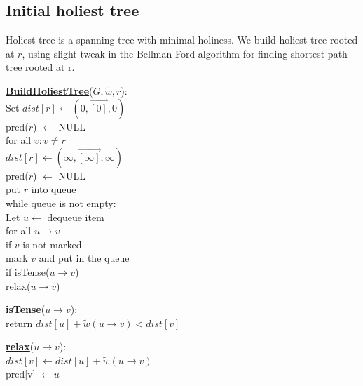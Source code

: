 \documentclass{article}
\begin{document}
\subsection{Initial holiest tree}
Holiest tree is a spanning tree with minimal holiness. We build holiest tree 
rooted at $r$, using slight tweak in the Bellman-Ford algorithm for finding 
shortest path tree rooted at r. \\

\begin{minipage}[t]{0.58\linewidth}
\begin{algorithm}
\textbf{\underline{BuildHoliestTree}}($G, \tilde w , r$): \\ \quad
Set $dist[r] \leftarrow ( 0, \vec{[0]}, 0 )$ \\ \quad \quad
    pred($r$) $\leftarrow$ NULL \\ \quad
for all $v : v \neq r$ \\ \quad \quad
    $dist[r] \leftarrow ( \infty, \vec{[\infty]}, \infty )$ \\ \quad \quad
    pred($r$) $\leftarrow$ NULL \\ \quad
put $r$ into queue \\ \quad
while queue is not empty: \\ \quad \quad
    Let $u \leftarrow$ dequeue item \\ \quad \quad
    for all $u \rightarrow v$ \\ \qquad \quad
        if $v$ is not marked \\ \quad \qquad \quad
           mark $v$ and put in the queue \\ \qquad \quad
        if isTense($u \rightarrow v$) \\ \quad \qquad \quad
           relax($u \rightarrow v$)
\end{algorithm}
\end{minipage}
\hfill%
\hspace{-4cm}
\begin{minipage}[t]{0.38\linewidth}
\begin{algorithm}
\textbf{\underline{isTense}}($u \rightarrow v$): \\ \quad
return $dist[u] + \tilde w(u \rightarrow v) < dist[v]$ \\

\end{algorithm}

\vspace{0.5cm}

\begin{algorithm}
\textbf{\underline{relax}}($u \rightarrow v$): \\ \quad
$dist[v] \leftarrow dist[u] + \tilde w(u \rightarrow v)$ \\ \quad
pred[v] $\leftarrow u$ \\
\end{algorithm}
\end{minipage}
\end{document}

